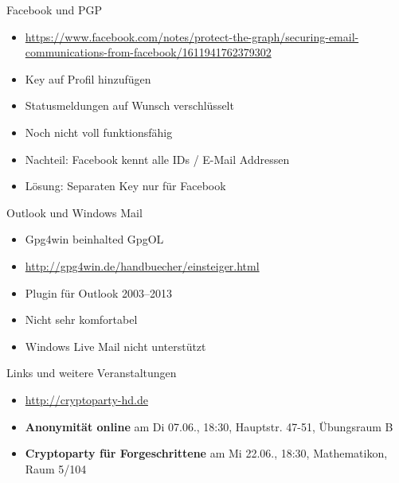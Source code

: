 \begin{frame}{Facebook und PGP}
	\begin{itemize}
		\item \url{https://www.facebook.com/notes/protect-the-graph/securing-email-communications-from-facebook/1611941762379302}
		\item Key auf Profil hinzufügen
		\item Statusmeldungen auf Wunsch verschlüsselt
		\item Noch nicht voll funktionsfähig
		\item Nachteil: Facebook kennt alle IDs / E-Mail Addressen
		\item Lösung: Separaten Key nur für Facebook
	\end{itemize}
\end{frame}

\begin{frame}{Outlook und Windows Mail}
	\begin{itemize}
		\item Gpg4win beinhalted GpgOL
		\item \url{http://gpg4win.de/handbuecher/einsteiger.html}
		\item Plugin für Outlook 2003--2013
		\item Nicht sehr komfortabel
		\item Windows Live Mail nicht unterstützt
	\end{itemize}
\end{frame}

\begin{frame}{Links und weitere Veranstaltungen}
	\begin{itemize}
		\item \url{http://cryptoparty-hd.de} \\[10pt]
		\item \textbf{Anonymität online} am Di 07.06., 18:30, Hauptstr. 47-51, Übungsraum B
		\item \textbf{Cryptoparty für Forgeschrittene} am Mi 22.06., 18:30, Mathematikon, Raum 5/104
	\end{itemize}
\end{frame}

